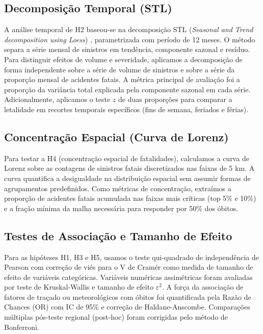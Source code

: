 \documentclass[12pt]{article}
\begin{document}
\subsection{Decomposição Temporal (STL)}
A análise temporal de H2 baseou-se na decomposição STL (\textit{Seasonal and Trend decomposition using Loess}) \cite{cleveland:1990}, parametrizada com período de 12 meses. O método separa a série mensal de sinistros em tendência, componente sazonal e resíduo. Para distinguir efeitos de volume e severidade, aplicamos a decomposição de forma independente sobre a série de volume de sinistros e sobre a série da proporção mensal de acidentes fatais. A métrica principal de avaliação foi a proporção da variância total explicada pela componente sazonal em cada série. Adicionalmente, aplicamos o teste $z$ de duas proporções para comparar a letalidade em recortes temporais específicos (fins de semana, feriados e férias).

\subsection{Concentração Espacial (Curva de Lorenz)}
Para testar a H4 (concentração espacial de fatalidades), calculamos a curva de Lorenz sobre as contagens de sinistros fatais discretizados nas faixas de 5 km. A curva quantifica a desigualdade na distribuição espacial sem assumir formas de agrupamentos predefinidos. Como métricas de concentração, extraímos a proporção de acidentes fatais acumulada nas faixas mais críticas (top 5\% e 10\%) e a fração mínima da malha necessária para responder por 50\% dos óbitos.

\subsection{Testes de Associação e Tamanho de Efeito}
Para as hipóteses H1, H3 e H5, usamos o teste qui-quadrado de independência de Pearson \cite{pearson:1900} com correção de viés para o V de Cramér \cite{bergsma:2013} como medida de tamanho de efeito de variáveis categóricas. Variáveis numéricas assimétricas foram avaliadas por teste de Kruskal-Wallis \cite{kruskal:1952} e tamanho de efeito $\varepsilon^2$. A força da associação de fatores de traçado ou meteorológicos com óbitos foi quantificada pela Razão de Chances (OR) com IC de 95\% e correção de Haldane-Anscombe. Comparações múltiplas pós-teste regional (post-hoc) foram corrigidas pelo método de Bonferroni.


\end{document}
